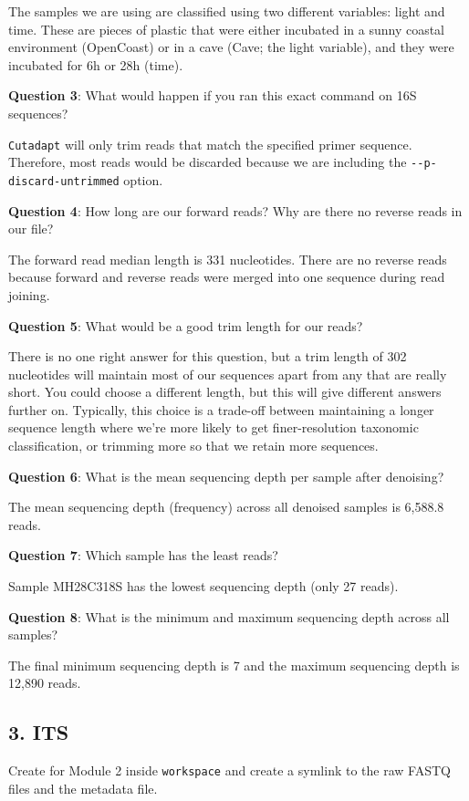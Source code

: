 \documentclass[
]{book}
\begin{document}
The samples we are using are classified using two different variables: light and time. These are pieces of plastic that were either incubated in a sunny coastal environment (OpenCoast) or in a cave (Cave; the light variable), and they were incubated for 6h or 28h (time).

\textbf{Question 3}: What would happen if you ran this exact command on 16S sequences?

\texttt{Cutadapt} will only trim reads that match the specified primer sequence. Therefore, most reads would be discarded because we are including the \texttt{-\/-p-discard-untrimmed} option.

\textbf{Question 4}: How long are our forward reads? Why are there no reverse reads in our file?

The forward read median length is 331 nucleotides. There are no reverse reads because forward and reverse reads were merged into one sequence during read joining.

\textbf{Question 5}: What would be a good trim length for our reads?

There is no one right answer for this question, but a trim length of 302 nucleotides will maintain most of our sequences apart from any that are really short. You could choose a different length, but this will give different answers further on. Typically, this choice is a trade-off between maintaining a longer sequence length where we're more likely to get finer-resolution taxonomic classification, or trimming more so that we retain more sequences.

\textbf{Question 6}: What is the mean sequencing depth per sample after denoising?

The mean sequencing depth (frequency) across all denoised samples is 6,588.8 reads.

\textbf{Question 7}: Which sample has the least reads?

Sample MH28C318S has the lowest sequencing depth (only 27 reads).

\textbf{Question 8}: What is the minimum and maximum sequencing depth across all samples?

The final minimum sequencing depth is 7 and the maximum sequencing depth is 12,890 reads.

\subsection{3. ITS}\label{its}

Create for Module 2 inside \texttt{workspace} and create a symlink to the raw FASTQ files and the metadata file.
\end{document}
